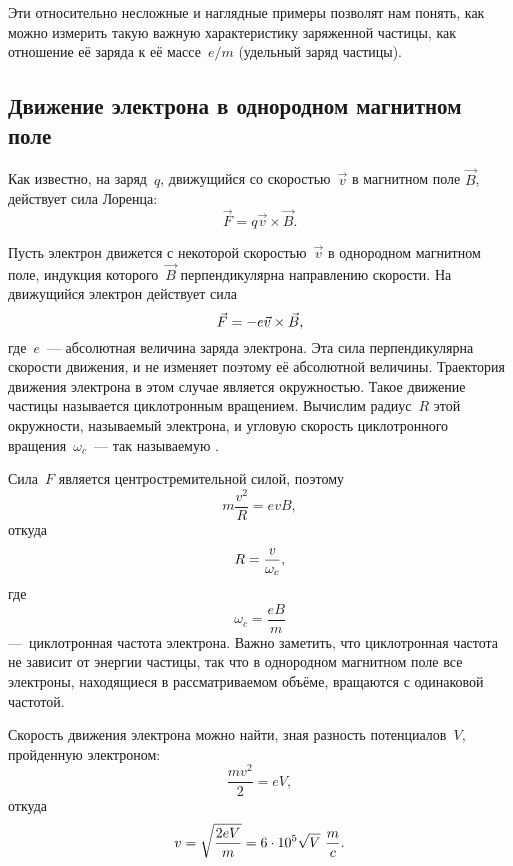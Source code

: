 Эти относительно несложные и наглядные примеры позволят нам понять, как можно
измерить такую важную характеристику
заряженной частицы, как отношение её заряда к её массе~$e/m$ (удельный заряд
частицы).

\subsection{Движение электрона в однородном магнитном поле}

Как известно, на заряд~$q$, движущийся со скоростью~$\vec{v}$ в магнитном поле
$\vec{B}$, действует сила Лоренца:
\begin{equation*}
	\vec{F}=q{\vec{v}}\times{\vec{B}}.
\end{equation*}

Пусть электрон движется с некоторой скоростью~$\vec{v}$ в однородном магнитном
поле, индукция которого~$\vec{B}$
перпендикулярна направлению скорости. На движущийся электрон действует сила
\begin{equation}
	\eqmark{3.1}
	\vec{F}=-e{\vec{v}}\times{\vec{B}},
\end{equation}
где~$e$~--- абсолютная величина заряда электрона. Эта сила перпендикулярна
скорости движения, и не изменяет поэтому её абсолютной величины. Траектория
движения электрона в этом случае является окружностью. Такое движение частицы
называется циклотронным вращением. Вычислим радиус~$R$ этой окружности,
называемый  электрона, и угловую скорость
циклотронного вращения~$\omega_c$~--- так называемую .

Сила~$F$ является центростремительной силой, поэтому
\begin{equation*}
	m\frac{v^2}{R}=evB,
\end{equation*}
откуда
\begin{equation}
	\eqmark{3.2}
	R =\frac{v}{\omega_c},
\end{equation}
где
\begin{equation*}
	\omega_c=\frac{eB}{m}
\end{equation*}
---~циклотронная частота электрона. Важно заметить, что циклотронная частота не
зависит от энергии частицы, так что в однородном магнитном поле все электроны,
находящиеся в рассматриваемом объёме, вращаются с одинаковой частотой.

Скорость движения электрона можно найти, зная разность потенциалов~$V$,
пройденную электроном:
\begin{equation*}
	\frac{mv^2}{2}=eV,
\end{equation*}
откуда
\begin{equation}
	\eqmark{3.3}
	v=\sqrt{\frac{2eV}{m}} = 6\cdot10^5\sqrt{V}~\frac{m}{c}.
\end{equation}


